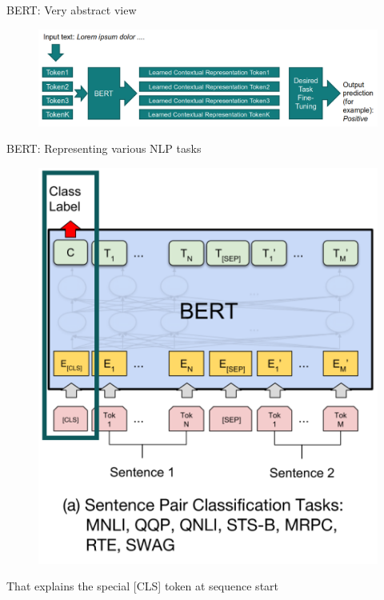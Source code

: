 \documentclass[12pt]{beamer}
\begin{document}
\begin{frame}{BERT: Very abstract view}
	
	\begin{figure}
		\includegraphics[width=\linewidth]{img/bert1.png}
	\end{figure}	
	
\end{frame}


\begin{frame}{BERT: Representing various NLP tasks}
	
\begin{figure}
	\includegraphics[width=0.5\linewidth]{img/task1.png}
\end{figure}
	
That explains the special [CLS] token at sequence start
	
\end{frame}
\end{document}
